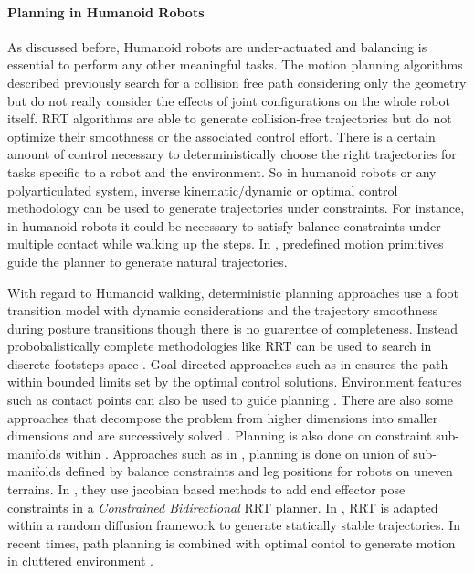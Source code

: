 \paragraph{Planning in Humanoid Robots}


As discussed before, Humanoid robots are under-actuated and balancing is essential to perform any other meaningful tasks. The motion planning algorithms described previously search for a collision free path considering only the geometry but do not really consider the effects of joint configurations on the whole robot itself. RRT algorithms are able to generate collision-free trajectories but do not optimize their smoothness or the associated control effort. There is a certain amount of control necessary to deterministically choose the right trajectories for tasks specific to a robot and the environment. So in humanoid robots or any polyarticulated system, inverse kinematic/dynamic or optimal control methodology can be used to generate trajectories under constraints. For instance, in humanoid robots it could be necessary to satisfy balance constraints under multiple contact while walking up the steps. In \cite{zhang2014motion}, predefined motion primitives guide the planner to generate natural trajectories.

With regard to Humanoid walking, deterministic planning approaches use a foot transition model with dynamic considerations and the trajectory smoothness during posture transitions \cite{chestnutt2005footstep,ayaz2007human} though there is no guarentee of completeness. Instead probobalistically complete methodologies like RRT can be used to search in discrete footsteps space \cite{perrin2012fast,xia2009random}. Goal-directed approaches such as in \cite{hornung2013search} ensures the path within bounded limits set by the optimal control solutions. Environment features such as contact points can also be used to guide planning \cite{bouyarmane2012dynamics,Escande2013}. There are also some approaches that decompose the problem from higher dimensions into smaller dimensions and are successively solved \cite{zhang2009motion,yoshida2008planning}. Planning is also done on constraint sub-manifolds within \CS{}. Approaches such as in \cite{bretl2006motion,hauser2010multi}, planning is done on union of sub-manifolds defined by balance constraints and leg positions for robots on uneven terrains. In \cite{berenson2011task}, they use jacobian based methods 
to add end effector pose constraints in a \textit{Constrained Bidirectional} RRT planner. In \cite{dalibard2013dynamic}, RRT is adapted within a random diffusion framework to generate statically stable trajectories. In recent times, path planning is combined with optimal contol to generate motion in cluttered environment \cite{el2013optimal}.

